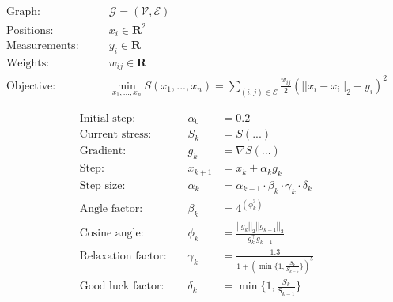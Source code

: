 \documentclass{article}
\begin{document}
\begin{align*}
    \text{Graph: } && &\mathcal{G} = (\mathcal{V}, \mathcal{E}) \\
    \text{Positions: } && & x_i \in \mathbf{R}^2 \\
    \text{Measurements: } && & y_i \in \mathbf{R} \\
    \text{Weights: } && & w_{ij} \in \mathbf{R} \\
    \text{Objective: } && &\min_{{x_1, ..., x_n}} S({x_1, ..., x_n}) = \sum_{(i, j) \in \mathcal{E}} \frac{w_{ij}}{2}(\left|\left| x_i - x_i \right|\right|_2 - y_i)^2
\end{align*}

\begin{align*}
    \text{Initial step: } && \alpha_0 &= 0.2 \\
    \text{Current stress: } && S_k &= S(...) \\
    \text{Gradient: } && g_k &= \nabla S(...) \\
    \text{Step: } && x_{k+1} &= x_k + \alpha_k g_k \\
    \text{Step size: } && \alpha_{k} &= \alpha_{k-1} \cdot \beta_k \cdot \gamma_k \cdot \delta_k \\
    \text{Angle factor: } && \beta_k &= 4^{(\phi_k^3)} \\
    \text{Cosine angle: } && \phi_k &= \frac{\left|\left|g_k\right|\right|_2\left|\left|g_{k-1}\right|\right|_2}{g_k^\top g_{k-1}} \\
    \text{Relaxation factor: } &&\gamma_k &= \frac{1.3}{1 + (\min\{1, \frac{S_k}{S_{k-5}}\})^5} \\
    \text{Good luck factor: } && \delta_k &= \min\{1, \frac{S_k}{S_{k-1}}\}
\end{align*}
\end{document}
